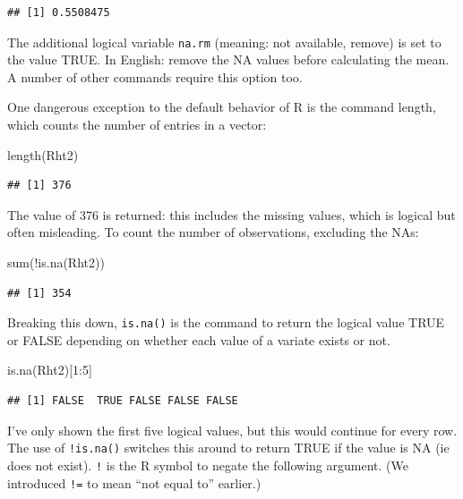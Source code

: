 \documentclass[
]{book}
\newenvironment{Shaded}{\begin{snugshade}}{\end{snugshade}}
\newcommand{\DecValTok}[1]{\textcolor[rgb]{0.00,0.00,0.81}{#1}}
\newcommand{\FunctionTok}[1]{\textcolor[rgb]{0.00,0.00,0.00}{#1}}
\newcommand{\NormalTok}[1]{#1}
\newcommand{\SpecialCharTok}[1]{\textcolor[rgb]{0.00,0.00,0.00}{#1}}
\begin{document}
\begin{verbatim}
## [1] 0.5508475
\end{verbatim}

The additional logical variable \texttt{na.rm} (meaning: not available, remove) is set to the value TRUE. In English: remove the NA values before calculating the mean. A number of other commands require this option too.

One dangerous exception to the default behavior of R is the command length, which counts the number of entries in a vector:

\begin{Shaded}
\begin{Highlighting}[]
\FunctionTok{length}\NormalTok{(Rht2)}
\end{Highlighting}
\end{Shaded}

\begin{verbatim}
## [1] 376
\end{verbatim}

The value of 376 is returned: this includes the missing values, which is logical but often misleading. To count the number of observations, excluding the NAs:

\begin{Shaded}
\begin{Highlighting}[]
\FunctionTok{sum}\NormalTok{(}\SpecialCharTok{!}\FunctionTok{is.na}\NormalTok{(Rht2))}
\end{Highlighting}
\end{Shaded}

\begin{verbatim}
## [1] 354
\end{verbatim}

Breaking this down, \texttt{is.na()} is the command to return the logical value TRUE or FALSE depending on whether each value of a variate exists or not.

\begin{Shaded}
\begin{Highlighting}[]
\FunctionTok{is.na}\NormalTok{(Rht2)[}\DecValTok{1}\SpecialCharTok{:}\DecValTok{5}\NormalTok{]}
\end{Highlighting}
\end{Shaded}

\begin{verbatim}
## [1] FALSE  TRUE FALSE FALSE FALSE
\end{verbatim}

I've only shown the first five logical values, but this would continue for every row. The use of \texttt{!is.na()} switches this around to return TRUE if the value is NA (ie does not exist). \texttt{!} is the R symbol to negate the following argument. (We introduced \texttt{!=} to mean ``not equal to'' earlier.)
\end{document}
